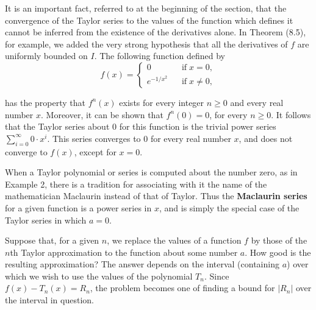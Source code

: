 It is an important fact, referred to at the beginning of the section, that the convergence of the Taylor series to the values of the function which defines it cannot be inferred from the existence of the derivatives alone. In Theorem (8.5), for example, we added the very strong hypothesis that all the derivatives of $f$ are uniformly bounded on $I$. The following function
defined by
$$
f(x)= \left \{ \begin{array}{ll}
0 				& \;\;\;\mbox{if}\; x = 0 ,\\
e^{-1/x^2} & \;\;\;\mbox{if}\; x \neq 0 ,
\end{array}
\right.
$$

\noindent has the property that $f^n(x)$ exists for every integer $n \geq 0$ and every real number $x$. Moreover, it can be shown that $f^n(0) = 0$, for every $n \geq 0$. It follows that the Taylor series about 0 for this function is the trivial power series $\sum_{i=0}^\infty 0 \cdot x^i$. This series converges to 0 for every real number $x$, and does not converge to $f(x)$, except for $x = 0$.

When a Taylor polynomial or series is computed about the number zero, as in Example 2, there is a tradition for associating with it the name of the
mathematician Maclaurin instead of that of Taylor. Thus the \textbf{Maclaurin series} for a given function is a power series in $x$, and is simply the special case of the Taylor series in which $a = 0$.

Suppose that, for a given $n$, we replace the values of a function $f$ by those of the $n$th Taylor approximation to the function about some number $a$. How good is the resulting approximation? The answer depends on the interval (containing $a$) over which we wish to use the values of the polynomial $T_n$. Since $f(x) - T_n(x) = R_n$, the problem becomes one of finding a bound for $|R_n|$ over the interval in question.


